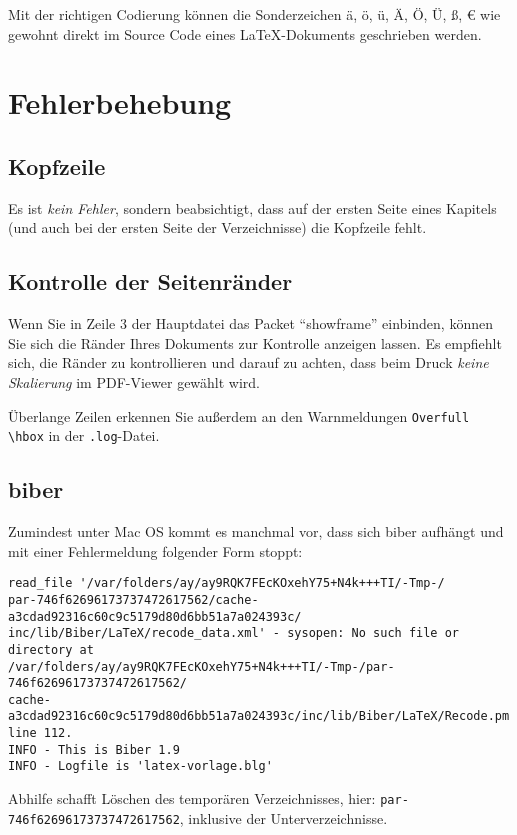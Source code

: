 Mit der richtigen Codierung können die Sonderzeichen ä, ö, ü, Ä, Ö, Ü, ß, € wie gewohnt direkt im Source Code eines \LaTeX-Dokuments geschrieben werden.

\section{Fehlerbehebung}

\subsection{Kopfzeile}
Es ist \emph{kein Fehler}, sondern beabsichtigt, dass auf der ersten Seite eines Kapitels (und auch bei der ersten Seite der Verzeichnisse) die Kopfzeile fehlt.

\subsection{Kontrolle der Seitenränder}
Wenn Sie in Zeile 3 der Hauptdatei das Packet \enquote{showframe} einbinden, können Sie sich die Ränder Ihres Dokuments zur Kontrolle anzeigen lassen. Es empfiehlt sich, die Ränder zu kontrollieren und darauf zu achten, dass beim Druck \emph{keine Skalierung} im PDF-Viewer gewählt wird.  

Überlange Zeilen erkennen Sie außerdem an den Warnmeldungen \verb|Overfull \hbox| in der \verb|.log|-Datei.

\subsection{biber}
Zumindest unter Mac OS kommt es manchmal vor, dass sich biber aufhängt und mit einer Fehlermeldung folgender Form stoppt:

{\small
\begin{verbatim}
read_file '/var/folders/ay/ay9RQK7FEcKOxehY75+N4k+++TI/-Tmp-/
par-746f62696173737472617562/cache-a3cdad92316c60c9c5179d80d6bb51a7a024393c/
inc/lib/Biber/LaTeX/recode_data.xml' - sysopen: No such file or directory at 
/var/folders/ay/ay9RQK7FEcKOxehY75+N4k+++TI/-Tmp-/par-746f62696173737472617562/
cache-a3cdad92316c60c9c5179d80d6bb51a7a024393c/inc/lib/Biber/LaTeX/Recode.pm 
line 112.
INFO - This is Biber 1.9
INFO - Logfile is 'latex-vorlage.blg'
\end{verbatim}
}

Abhilfe schafft Löschen des temporären Verzeichnisses, hier: \verb|par-746f62696173737472617562|, inklusive der Unterverzeichnisse.

